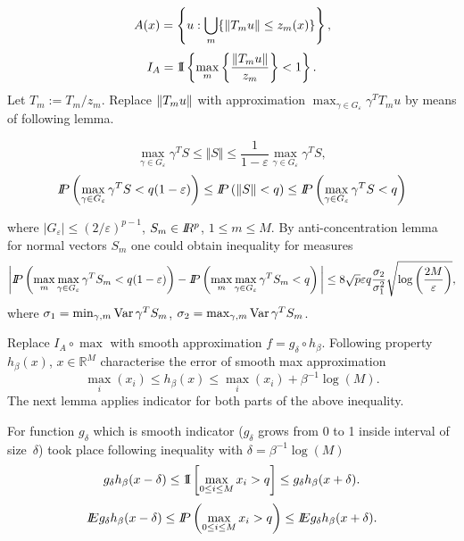 



\usepackage{flowchart}
\usetikzlibrary{arrows}

\usepackage{natbib}






\[
A(x) = \left\{
u: \bigcup_m \{ \normp{T_m u} \leq z_m(x) \}
\right\},
\]    
\[
I_A = \Ind \left\{
\max_m \left\{ \frac{\normp{T_m u}}{z_m}  \right\} < 1
\right\}.
\]
Let $T_m := T_m / z_m$. 
Replace $\normp{T_m u}$ with approximation $\max_{\gamma \in G_{\varepsilon}} \gamma^{T} T_m u$ by means of following lemma.    
\begin{lemma}
\[
 \max_{\gamma \in G_{\varepsilon}} \gamma^T S   \leq  \Vert S \Vert \leq \frac{1}{1 - \varepsilon} \max_{\gamma \in G_{\varepsilon}} \gamma^T S, 
\]
\[
\P \left(\max_{\gamma \in G_{\varepsilon}} \gamma^T S < q (1- \varepsilon) \right) \leq \P \left( \Vert S \Vert < q \right) \leq \P \left(\max_{\gamma \in G_{\varepsilon}} \gamma^T S  < q \right)  
\]
\end{lemma}
where $|G_{\varepsilon}| \leq  (2/\varepsilon)^{p-1}$, $S_m \in \R^{p}$, $ 1\leq m \leq M$.
By anti-concentration lemma for normal vectors $S_m$ one could obtain inequality for measures
\[
\bigg| \P \left(\max_{m} \max_{\gamma \in G_{\varepsilon}} \gamma^T S_m  < q (1 - \varepsilon) \right) - 
\P \left( \max_{m} \max_{\gamma \in G_{\varepsilon}} \gamma^T S_m < q \right) \bigg| 
\leq 
8 \sqrt{p} \varepsilon q \frac{\sigma_2}{\sigma_1^2}\sqrt{\log \left( \frac{2M}{\varepsilon} \right)},
\] 
where $\sigma_1 = \min_{\gamma, m} \Var \gamma^{T} S_m $, $\sigma_2 = \max_{\gamma, m} \Var \gamma^{T} S_m $.
    
Replace  $I_A \circ \max$  with smooth approximation $ f = g_{\delta} \circ h_{\beta}$.  Following property $h_\beta (x)$, $x \in \mathbb{R}^M$ characterise the error of smooth max approximation
\[
 \max_i(x_i)  \leq  h_\beta (x) \leq \max_i(x_i)  +  \beta^{-1}\log(M).
\] 
The next lemma applies indicator for both parts of the above inequality. 
\begin{lemma}
For function $g_{\delta}$ which is smooth indicator ($g_{\delta}$ grows from 0 to 1 inside interval of size~${\delta}$) took place following inequality with $\delta = \beta^{-1} \log(M)$
\[
g_{\delta} h_\beta (x - \delta) \leq \Ind \left[\max_{0\leq i \leq M} x_i > q \right]  \leq g_{\delta} h_\beta (x + \delta).
\]
\[
\E g_{\delta} h_\beta (x - \delta)  \leq   \P \left(\max_{0\leq i \leq M} x_i > q \right)  \leq  \E  g_{\delta} h_\beta (x + \delta).
\]
\end{lemma}

